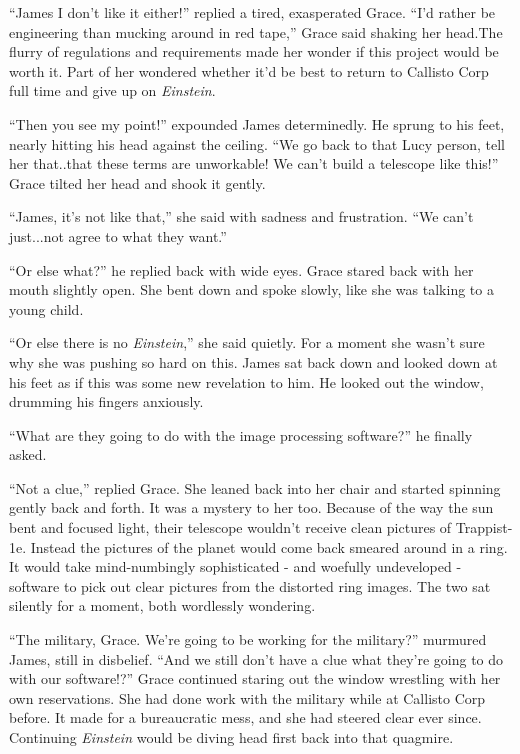 \documentclass[openany, 12pt]{book} %
\begin{document}
``James I don't like it either!'' replied a tired, exasperated Grace. ``I'd rather be engineering than mucking around in red tape,'' Grace said shaking her head.The flurry of regulations and requirements made her wonder if this project would be worth it. Part of her wondered whether it'd be best to return to Callisto Corp full time and give up on \textit{Einstein}.

``Then you see my point!'' expounded James determinedly. He sprung to his feet, nearly hitting his head against the ceiling. ``We go back to that Lucy person, tell her that..that these terms are unworkable! We can't build a telescope like this!'' Grace tilted her head and shook it gently.

``James, it's not like that,'' she said with sadness and frustration. ``We can't just...not agree to what they want.''

``Or else what?'' he replied back with wide eyes. Grace stared back with her mouth slightly open. She bent down and spoke slowly, like she was talking to a young child.

``Or else there is no \textit{Einstein},'' she said quietly. For a moment she wasn't sure why she was pushing so hard on this. James sat back down and looked down at his feet as if this was some new revelation to him. He looked out the window, drumming his fingers anxiously.

``What are they going to do with the image processing software?'' he finally asked.

``Not a clue,'' replied Grace. She leaned back into her chair and started spinning gently back and forth. It was a mystery to her too. Because of the way the sun bent and focused light, their telescope wouldn't receive clean pictures of Trappist-1e. Instead the pictures of the planet would come back smeared around in a ring. It would take mind-numbingly sophisticated - and woefully undeveloped - software to pick out clear pictures from the distorted ring images. The two sat silently for a moment, both wordlessly wondering.

``The military, Grace. We're going to be working for the military?'' murmured James, still in disbelief. ``And we still don't have a clue what they're going to do with our software!?'' Grace continued staring out the window wrestling with her own reservations. She had done work with the military while at Callisto Corp before. It made for a bureaucratic mess, and she had steered clear ever since. Continuing \textit{Einstein} would be diving head first back into that quagmire.
\end{document}
